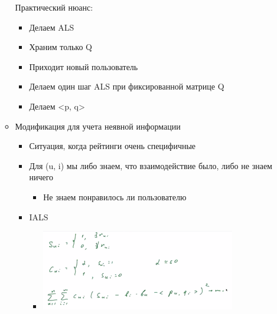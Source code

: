 \documentclass[a4paper, 12pt]{article}
\begin{document}
\begin{itemize}
\begin{itemize}
    Практический нюанс:
    

    \begin{itemize}
    \item
      
      Делаем ALS
      
    \item
      
      Храним только Q
      
    \item
      
      Приходит новый пользователь
      
    \item
      
      Делаем один шаг ALS при фиксированной матрице Q
      
    \item
      
      Делаем \textless{}p, q\textgreater{}
      
    \end{itemize}
  \item
    
    Модификация для учета неявной информации
    

    \begin{itemize}
    \item
      
      Ситуация, когда рейтинги очень специфичные
      
    \item
      
      Для (u, i) мы либо знаем, что взаимодействие было, либо не знаем
      ничего
      

      \begin{itemize}
      \item
        
        Не знаем понравилось ли пользователю
        
      \end{itemize}
    \item
      
      {IALS}
      

      \begin{itemize}
      \item
        
        \includegraphics[width=3.33333in,height=1.38430in]{media/image16.png}
        

\end{itemize}
\end{itemize}
\end{itemize}
\end{itemize}
\end{document}
